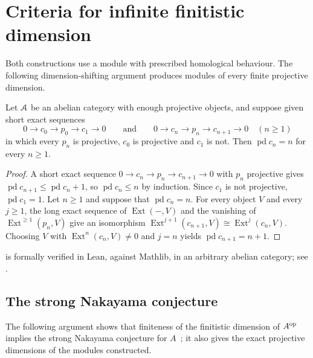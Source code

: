 \section{Criteria for infinite finitistic dimension}
\label{sec:criteria}

Both constructions use a module with prescribed homological behaviour. The
following dimension-shifting argument produces modules of every finite
projective dimension.

\begin{proposition}
  \label{prop:coresolution}
  Let $\mathcal{A}$ be an abelian category with enough projective objects, and suppose
  given short exact sequences
  \[
    0\to c_0\to p_0\to c_1\to0\qquad\text{and}\qquad
    0\to c_n\to p_n\to c_{n+1}\to0\quad(n\geq1)
  \]
  in which every $p_n$ is projective, $c_0$ is projective and $c_1$ is not.
  Then ${\operatorname{pd}c_n=n}$ for every ${n\geq1}$.
\end{proposition}

\begin{proof}
  A short exact sequence ${0\to c_n\to p_n\to c_{n+1}\to0}$ with $p_n$
  projective gives ${\operatorname{pd}c_{n+1}\leq\operatorname{pd}c_n+1}$, so
  ${\operatorname{pd}c_n\leq n}$ by induction. Since $c_1$ is not projective,
  ${\operatorname{pd}c_1=1}$. Let ${n\geq1}$ and suppose that
  ${\operatorname{pd}c_n=n}$. For every object $V$ and every ${j\geq1}$, the long
  exact sequence of ${\operatorname{Ext}(-,V)}$ and the vanishing of
  $\operatorname{Ext}^{\geq1}(p_n,V)$ give an isomorphism
  ${\operatorname{Ext}^{j+1}(c_{n+1},V)\cong\operatorname{Ext}^j(c_n,V)}$.
  Choosing $V$ with ${\operatorname{Ext}^n(c_n,V)\neq0}$ and ${j=n}$ yields
  ${\operatorname{pd}c_{n+1}=n+1}$.
\end{proof}

\begin{remark}
   is formally verified in Lean, against Mathlib, in an
  arbitrary abelian category; see .
\end{remark}

\subsection{The strong Nakayama conjecture}
\label{subsec:strong-nakayama}

The following argument shows that finiteness of the finitistic dimension of
$A^{\mathrm{op}}$ implies the strong Nakayama conjecture for $A$~\cite[Section~3.2,
Proposition~5]{CB19}; it also gives the exact projective dimensions of the
modules constructed.

